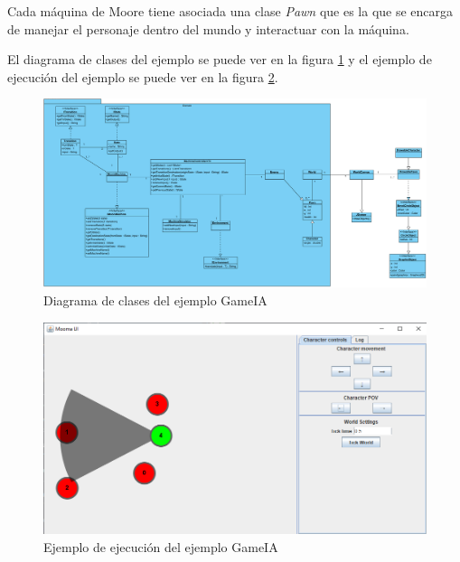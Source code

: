 \documentclass{pre-tfg}
\begin{document}
Cada máquina de Moore tiene asociada una clase \emph{Pawn} que es la que se encarga de manejar el personaje dentro del mundo y interactuar con la máquina.

El diagrama de clases del ejemplo se puede ver en la figura \ref{fig:classdiagram} y el ejemplo de ejecución del ejemplo se puede ver en la figura \ref{fig:moomauiexample}.

\begin{figure}[]
    \centering
    \includegraphics[width=\linewidth]{figures/classdiagram.png}
    \caption{Diagrama de clases del ejemplo GameIA}
    \label{fig:classdiagram}
\end{figure}

\begin{figure}[b]
    \centering
    \includegraphics[width=\linewidth]{figures/moomauiexample.png}
    \caption{Ejemplo de ejecución del ejemplo GameIA}
    \label{fig:moomauiexample}
\end{figure}
\end{document}
